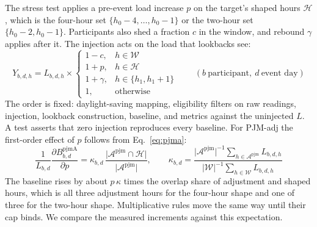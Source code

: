 The stress test applies a pre-event load increase $p$ on the target's shaped hours $\mathcal{H}$, which is the four-hour set $\{h_0-4,\dots,h_0-1\}$ or the two-hour set $\{h_0-2,h_0-1\}$. Participants also shed a fraction $c$ in the window, and rebound $\gamma$ applies after it. The injection acts on the load that lookbacks see:
\begin{equation}\label{eq:inject}
Y_{b,d,h}=L_{b,d,h}\times\begin{cases}1-c, & h\in\mathcal{W}\\ 1+p, & h\in\mathcal{H}\\ 1+\gamma, & h\in\{h_1,h_1+1\}\\ 1, & \text{otherwise}\end{cases}\qquad (b\ \text{participant},\ d\ \text{event day})
\end{equation}
The order is fixed: daylight-saving mapping, eligibility filters on raw readings, injection, lookback construction, baseline, and metrics against the uninjected $L$. A test asserts that zero injection reproduces every baseline. For PJM-adj the first-order effect of $p$ follows from Eq.~\eqref{eq:pjma}:
\begin{equation}\label{eq:sens}
\frac{1}{L_{b,d}}\frac{\partial B^{\mathrm{pjmA}}_{b,d}}{\partial p}=\kappa_{b,d}\,\frac{\lvert\mathcal{A}^{\mathrm{pjm}}\cap\mathcal{H}\rvert}{\lvert\mathcal{A}^{\mathrm{pjm}}\rvert},\qquad \kappa_{b,d}=\frac{\lvert\mathcal{A}^{\mathrm{pjm}}\rvert^{-1}\sum_{h\in\mathcal{A}^{\mathrm{pjm}}}L_{b,d,h}}{\lvert\mathcal{W}\rvert^{-1}\sum_{h\in\mathcal{W}}L_{b,d,h}}
\end{equation}
The baseline rises by about $p\,\kappa$ times the overlap share of adjustment and shaped hours, which is all three adjustment hours for the four-hour shape and one of three for the two-hour shape. Multiplicative rules move the same way until their cap binds. We compare the measured increments against this expectation.

